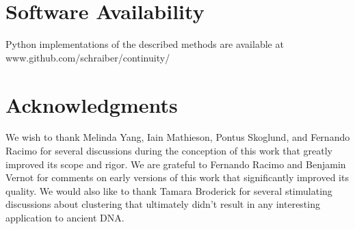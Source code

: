 \documentclass[11pt, oneside]{article}   	%
\begin{document}
\section{Software Availability}
Python implementations of the described methods are available at www.github.com/schraiber/continuity/

\section{Acknowledgments}
We wish to thank Melinda Yang, Iain Mathieson, Pontus Skoglund, and Fernando Racimo for several discussions during the conception of this work that greatly improved its scope and rigor. We are grateful to Fernando Racimo and Benjamin Vernot for comments on early versions of this work that significantly improved its quality. We would also like to thank Tamara Broderick for several stimulating discussions about clustering that ultimately didn't result in any interesting application to ancient DNA. 

 
 
\end{document}
